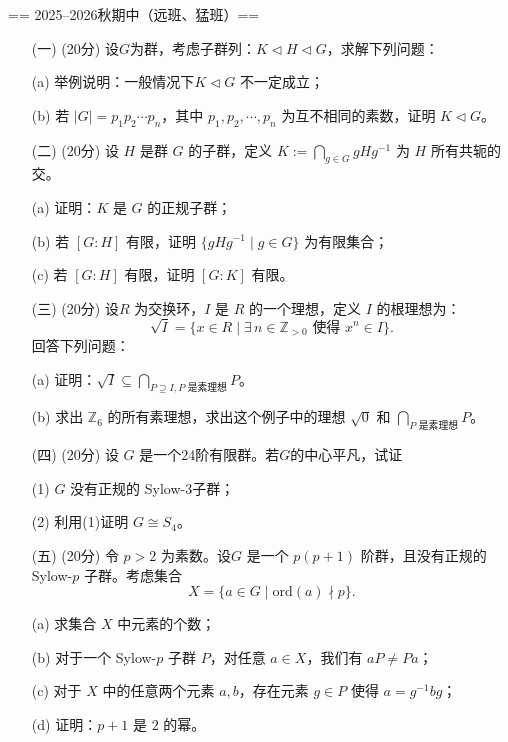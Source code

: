 == 2025--2026秋期中（远班、猛班）==
\begin{itemize}
\item[(一)] (20分) 设$G$为群，考虑子群列：$K \triangleleft H \triangleleft G$，求解下列问题：
    \item[(a)] 举例说明：一般情况下$K \triangleleft G$ 不一定成立； \\
    \item[(b)]若 $|G| = p_1p_2\cdots p_n$，其中 $ p_1,p_2,\cdots, p_n $ 为互不相同的素数，证明 $K \triangleleft G$。

\item[(二)] (20分) 设 $H$ 是群 $G$ 的子群，定义 $K := \bigcap_{g \in G} gHg^{-1}$ 为 $H$ 所有共轭的交。 \\
   \item[(a)]证明：$K$ 是 $G$ 的正规子群； \\
   \item[(b)]若 $[G:H]$ 有限，证明 $\{ gHg^{-1} \mid g \in G \}$ 为有限集合； \\
   \item[(c)]若 $[G:H]$ 有限，证明 $[G:K]$ 有限。

\item[(三)] (20分) 设$R$ 为交换环，$I$ 是 $R$ 的一个理想，定义 $I$ 的根理想为：
    \[
    \sqrt{I} = \{ x \in R \mid \exists\, n \in \mathbb{Z}_{>0} \text{ 使得 } x^n \in I \}.
    \]
    回答下列问题：
    \item[(a)]证明：$\sqrt{I} \subseteq \bigcap_{P \supseteq I,P\text{ 是素理想}} P$。 \\
    \item[(b)]求出 $\mathbb{Z}_6$ 的所有素理想，求出这个例子中的理想 $\sqrt{0}$ 和 $\bigcap_{P\text{ 是素理想}} P$。

\item[(四)] (20分) 设 $G$ 是一个$24$阶有限群。若$G$的中心平凡，试证 \\
   \item[(1)]$G$ 没有正规的 Sylow-$3$子群； \\
   \item[(2)]利用(1)证明 $G \cong S_4$。

\item[(五)] (20分) 令 $p>2$ 为素数。设$G$ 是一个 $p(p+1)$ 阶群，且没有正规的 Sylow-$p$ 子群。考虑集合
    \[
    X = \{ a \in G \mid \mathrm{ord}(a) \nmid p \}.
    \]
   \item[(a)]求集合 $X$ 中元素的个数； \\
   \item[(b)]对于一个 Sylow-$p$ 子群 $P$，对任意 $a \in X$，我们有 $aP \neq Pa$； \\
   \item[(c)]对于 $X$ 中的任意两个元素 $a,b$，存在元素 $g \in P$ 使得 $a = g^{-1} b g$； \\
   \item[(d)]证明：$p + 1$ 是 $2$ 的幂。
\end{itemize}

